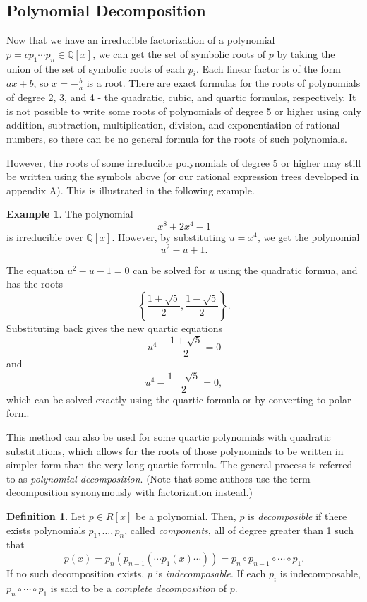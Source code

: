 \documentclass{article}
\theoremstyle{definition}
\newtheorem{defin}[thm]{Definition}
\newtheorem{exa}[thm]{Example}
\begin{document}
\subsection{Polynomial Decomposition}

Now that we have an irreducible factorization of a polynomial $p = cp_1\cdots p_n \in \mathbb{Q}[x]$, we can get the set of symbolic roots of $p$ by taking the union of the set of symbolic roots of each $p_i$. Each linear factor is of the form $ax+b$, so $x=-\frac{b}{a}$ is a root. There are exact formulas for the roots of polynomials of degree 2, 3, and 4 - the quadratic, cubic, and quartic formulas, respectively. It is not possible to write some roots of polynomials of degree 5 or higher using only addition, subtraction, multiplication, division, and exponentiation of rational numbers, so there can be no general formula for the roots of such polynomials.

However, the roots of some irreducible polynomials of degree 5 or higher may still be written using the symbols above (or our rational expression trees developed in appendix A). This is illustrated in the following example.

\begin{exa}
    The polynomial \[x^8 + 2x^4 - 1\] is irreducible over $\mathbb{Q}[x]$. However, by substituting $u=x^4$, we get the polynomial
    \[ u^2-u+1.\]
    
    The equation $u^2-u-1 = 0$ can be solved for $u$ using the quadratic formua, and has the roots \[ \left\{\frac{1+\sqrt{5}}{2}, \frac{1-\sqrt{5}}{2} \right\}.\] Substituting back gives the new quartic equations \[u^4 - \frac{1+\sqrt{5}}{2} = 0\] and 
    \[u^4 - \frac{1-\sqrt{5}}{2}=0,\]
    which can be solved exactly using the quartic formula or by converting to polar form.
\end{exa}

This method can also be used for some quartic polynomials with quadratic substitutions, which allows for the roots of those polynomials to be written in simpler form than the very long quartic formula. The general process is referred to as \emph{polynomial decomposition}. (Note that some authors use the term decomposition synonymously with factorization instead.)

\begin{defin}
    Let $p \in R[x]$ be a polynomial. Then, $p$ is \emph{decomposible} if there exists polynomials $p_1, \ldots, p_n$, called \emph{components}, all of degree greater than 1 such that
    \[p(x) = p_n(p_{n-1}(\cdots p_1(x)\cdots)) = p_n \circ p_{n-1} \circ \cdots \circ p_1.\]
    If no such decomposition exists, $p$ is \emph{indecomposable}. If each $p_i$ is indecomposable, $ p_n \circ \cdots  \circ p_1$ is said to be a \emph{complete decomposition} of $p$.
\end{defin}
\end{document}
